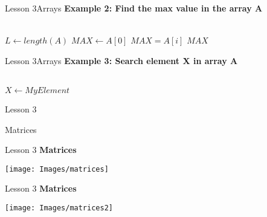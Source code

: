 \documentclass[aspectratio=1610]{beamer}
\begin{document}
\begin{frame}{Lesson 3}{Arrays}
\Large
\textbf{Example 2: Find the max value in the array A}\\~\\


\label{MaxArray}
\begin{algorithmic}[1]
 
\State $L\gets length(A)$
\State $MAX\gets A[0]$
    \State \textbf{$MAX = A[i]$} 
\EndIf
\EndFor
\State \Return $MAX$
\EndProcedure
\end{algorithmic}
\end{frame}



\begin{frame}{Lesson 3}{Arrays}
\Large
\textbf{Example 3: Search element X in array A}\\~\\
\label{SearchArray}
\begin{algorithmic}[1]
 
\State $X\gets MyElement$
    \State {}  
\EndIf
\EndFor
\State {} 
\EndProcedure
\end{algorithmic}
\end{frame}


\begin{frame}{Lesson 3}{}
\begin{center}
\Huge Matrices
\end{center}
\end{frame}


\begin{frame}{Lesson 3}{}
\LARGE
\textbf{Matrices}
\begin{center}
\texttt{[image: Images/matrices]}
\end{center}
\end{frame}


\begin{frame}{Lesson 3}{}
\LARGE
\textbf{Matrices}
\begin{center}
\texttt{[image: Images/matrices2]}
\end{center}
\end{frame}
\end{document}
